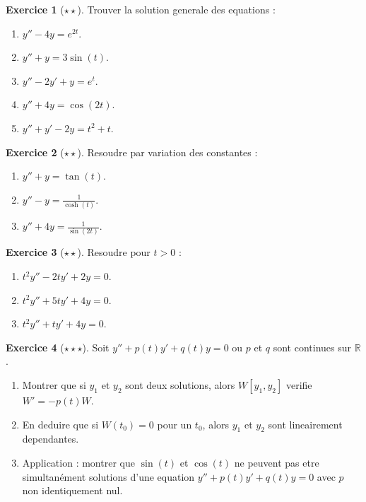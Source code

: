 \documentclass[12pt,a4paper,openany]{book}
\theoremstyle{definition}
\newtheorem{exercice}{Exercice}[chapter]
\theoremstyle{plain}
\theoremstyle{remark}
\newcommand{\R}{\mathbb{R}}
\begin{document}
\begin{exercice}[$\star\star$]\label{exo:coefficients-indetermines}
Trouver la solution generale des equations :
\begin{enumerate}[label=(\alph*)]
  \item $y'' - 4y = e^{2t}$.
  \item $y'' + y = 3\sin(t)$.
  \item $y'' - 2y' + y = e^t$.
  \item $y'' + 4y = \cos(2t)$.
  \item $y'' + y' - 2y = t^2 + t$.
\end{enumerate}
\end{exercice}

\begin{exercice}[$\star\star$]\label{exo:variation-constantes}
Resoudre par variation des constantes :
\begin{enumerate}[label=(\alph*)]
  \item $y'' + y = \tan(t)$.
  \item $y'' - y = \frac{1}{\cosh(t)}$.
  \item $y'' + 4y = \frac{1}{\sin(2t)}$.
\end{enumerate}
\end{exercice}

\begin{exercice}[$\star\star$]\label{exo:euler-cauchy}
Resoudre pour $t > 0$ :
\begin{enumerate}[label=(\alph*)]
  \item $t^2 y'' - 2ty' + 2y = 0$.
  \item $t^2 y'' + 5ty' + 4y = 0$.
  \item $t^2 y'' + ty' + 4y = 0$.
\end{enumerate}
\end{exercice}

\begin{exercice}[$\star\star\star$]\label{exo:wronskien-calcul}
Soit $y'' + p(t)y' + q(t)y = 0$ ou $p$ et $q$ sont continues sur $\R$.
\begin{enumerate}[label=(\alph*)]
  \item Montrer que si $y_1$ et $y_2$ sont deux solutions, alors $W[y_1, y_2]$ verifie $W' = -p(t)W$.
  \item En deduire que si $W(t_0) = 0$ pour un $t_0$, alors $y_1$ et $y_2$ sont lineairement dependantes.
  \item Application : montrer que $\sin(t)$ et $\cos(t)$ ne peuvent pas etre simultanément solutions d'une equation $y'' + p(t)y' + q(t)y = 0$ avec $p$ non identiquement nul.
\end{enumerate}
\end{exercice}
\end{document}
